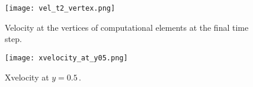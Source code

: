 \begin{figure}
\begin{center}
\texttt{[image: vel\_t2\_vertex.png]}
\end{center}
\caption{Velocity at the vertices of computational elements at the final time step.}
\end{figure}


\begin{figure}
\begin{center}
\texttt{[image: xvelocity\_at\_y05.png]}
\end{center}
\caption{Xvelocity at $y=0.5$\,.}
\end{figure}

\endinput
